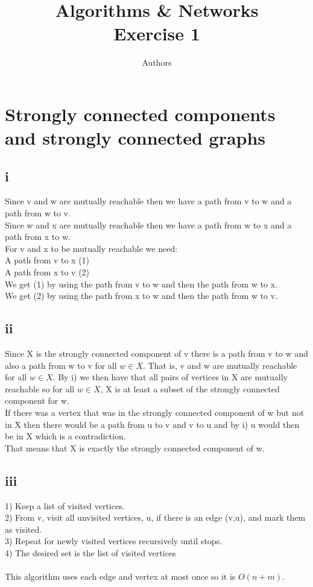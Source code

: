 \documentclass[a4paper]{article}
\author{Authors}
\title{Algorithms \& Networks \\ Exercise 1}
\begin{document}
\maketitle
\section{Strongly connected components and strongly connected graphs}
\subsection*{i}
Since v and w are mutually reachable then we have a path from v to w and a path from w to v. \\
Since w and x are mutually reachable then we have a path from w to x and a path from x to w.\\
For v and x to be mutually reachable we need:\\
\indent A path from v to x (1) \\ 
\indent A path from x to v (2) \\
We get (1) by using the path from v to w and then the path from w to x. \\
We get (2) by using the path from x to w and then the path from w to v.

\subsection*{ii}
Since X is the strongly connected component of v there is a path from v to w and also a path from w to v for all $w \in X$. That is, v and w are mutually reachable for all $w \in X$. By i) we then have that all pairs of vertices in X are mutually reachable so for all $w \in X$, X is at least a subset of the strongly connected component for w. \\
If there was a vertex that was in the strongly connected component of w but not in X then there would be a path from u to v and v to u and by i) u would then be in X which is a contradiction. \\
That means that X is exactly the strongly connected component of w.
\subsection*{iii}
1) Keep a list of visited vertices. \\
2) From v, visit all unvisited vertices, u, if there is an edge (v,u), and mark them as visited. \\
3) Repeat for newly visited vertices recursively until stops. \\
4) The desired set is the list of visited vertices\\
\\
This algorithm uses each edge and vertex at most once so it is $O(n + m)$.
\end{document}
